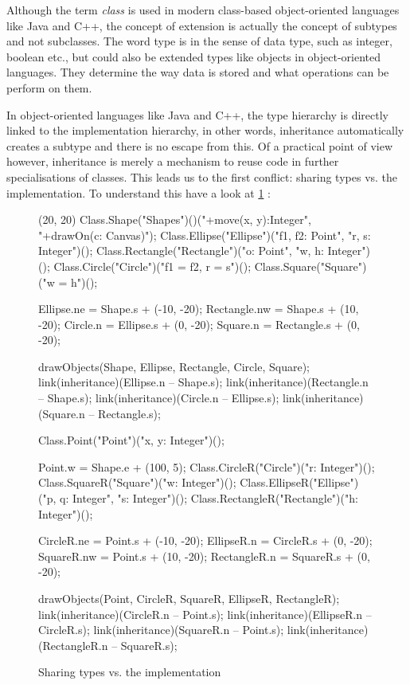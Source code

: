 Although the term \emph{class} is used in modern class-based object-oriented
languages like Java and C++, the concept of extension is actually the
concept of subtypes and not subclasses. The word type is in the sense of data type, such
as integer, boolean etc., but could also be extended types like objects
in object-oriented languages. They determine the way data is stored and
what operations can be perform on them.

In object-oriented languages like Java and C++, the type hierarchy
is directly linked to the implementation hierarchy, in other words,
inheritance automatically creates a subtype and there is no escape
from this. Of a practical point of view however, inheritance is merely
a mechanism to reuse code in further specialisations of classes. This
leads us to the first conflict: sharing types vs. the implementation. To
understand this have a look at \cref{fig:implementationConflict}
\cite{simons_theory_2003-4}:

\begin{figure}[H]
	\centering
	\begin{emp}[classdiag](20, 20)
		Class.Shape("Shapes")()("+move(x, y):Integer", "+drawOn(c: Canvas)");
		Class.Ellipse("Ellipse")("f1, f2: Point", "r, s: Integer")();
		Class.Rectangle("Rectangle")("o: Point", "w, h: Integer")();
		Class.Circle("Circle")("{f1 = f2, r = s}")();
		Class.Square("Square")("{w = h}")();

		Ellipse.ne = Shape.s + (-10, -20);
		Rectangle.nw = Shape.s + (10, -20);
		Circle.n = Ellipse.s + (0, -20);
		Square.n = Rectangle.s + (0, -20);

		drawObjects(Shape, Ellipse, Rectangle, Circle, Square);
		link(inheritance)(Ellipse.n -- Shape.s);
		link(inheritance)(Rectangle.n -- Shape.s);
		link(inheritance)(Circle.n -- Ellipse.s);
		link(inheritance)(Square.n -- Rectangle.s);

		Class.Point("Point")("x, y: Integer")();

		Point.w = Shape.e + (100, 5);
		Class.CircleR("Circle")("r: Integer")();
		Class.SquareR("Square")("w: Integer")();
		Class.EllipseR("Ellipse")("p, q: Integer", "s: Integer")();
		Class.RectangleR("Rectangle")("h: Integer")();

		CircleR.ne = Point.s + (-10, -20);
		EllipseR.n = CircleR.s + (0, -20);
		SquareR.nw = Point.s + (10, -20);
		RectangleR.n = SquareR.s + (0, -20);

		drawObjects(Point, CircleR, SquareR, EllipseR, RectangleR);
		link(inheritance)(CircleR.n -- Point.s);
		link(inheritance)(EllipseR.n -- CircleR.s);
		link(inheritance)(SquareR.n -- Point.s);
		link(inheritance)(RectangleR.n -- SquareR.s);

	\end{emp}
	\caption{Sharing types vs. the implementation}
	\label{fig:implementationConflict}
\end{figure}

